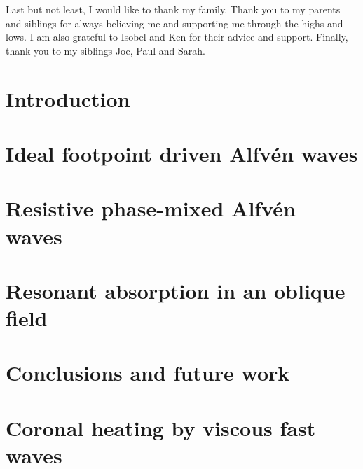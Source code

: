 \documentclass[12pt,fleqn]{report}
\numberwithin{equation}{section}
\begin{document}
Last but not least, I would like to thank my family. Thank you to my parents and siblings for always believing me and supporting me through the highs and lows. I am also grateful to Isobel and Ken for their advice and support. Finally, thank you to my siblings Joe, Paul and Sarah.
 
\tableofcontents

\chapter{Introduction}
\label{chap:introduction}


\chapter{Ideal footpoint driven Alfv\'en waves}
\label{chap:ideal_footpoint_driven_alfven_waves}


\chapter{Resistive phase-mixed Alfv\'en waves}
\label{chap:resistive_phase_mixed_alfven_waves}

 
\chapter{Resonant absorption in an oblique field}
\label{chap:resonant_absorption_in_an_oblique_field}

 
\chapter{Conclusions and future work}
\label{chap:conclusions_and_future_work}


\appendix
\chapter{Coronal heating by viscous fast waves}
\label{adx:coronal_heating_by_viscous_fast_waves}




\end{document}

